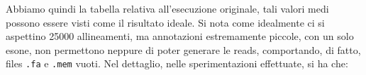 \documentclass[a4paper,12pt, oneside]{book}
\begin{document}

Abbiamo quindi la tabella relativa all'esecuzione originale, tali valori medi
possono essere visti come il risultato ideale. Si nota come idealmente ci si
aspettino 25000 allineamenti, ma annotazioni estremamente
piccole, con un solo esone, non permettono neppure di poter generare le reads,
comportando, di fatto, files \texttt{.fa} e \texttt{.mem} vuoti. Nel dettaglio,
nelle sperimentazioni effettuate, si ha che:
\end{document}
